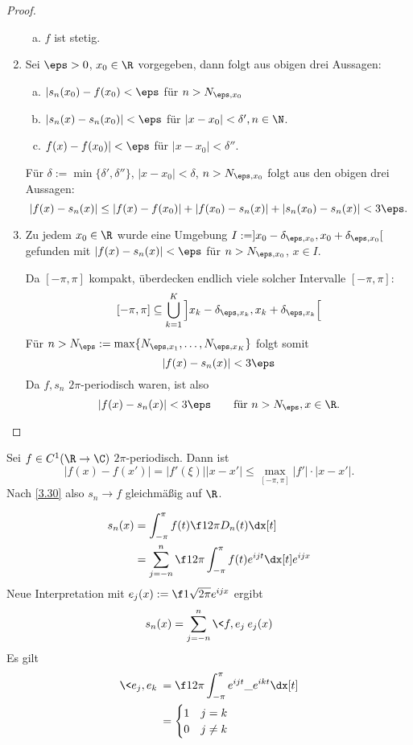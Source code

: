 \begin{st}
\begin{proof}
\begin{enumerate}[1)]
\begin{enumerate}[a)]
					\item
						$f$ ist stetig.
				\end{enumerate}
			\item
				Sei $\eps > 0$, $x_0 \in \R$ vorgegeben, dann folgt aus obigen drei Aussagen:
				\begin{enumerate}[a)]
					\item
						$|s_n(x_0) - f(x_0) < \eps$ für $n > N_{\eps, x_0}$
					\item
						$|s_n(x) - s_n(x_0)| < \eps$ für $|x-x_0| < \delta', n\in \N$.
					\item
						$f(x) - f(x_0)| < \eps$ für $|x-x_0| < \delta''$.
				\end{enumerate}
				Für $\delta := \min\{\delta', \delta''\}$, $|x-x_0| < \delta$, $n > N_{\eps, x_0}$ folgt aus den obigen drei Aussagen:
				\[
					|f(x) - s_n(x)| 
					\le |f(x) - f(x_0)| + |f(x_0)-s_n(x)| + |s_n(x_0) - s_n(x)|
					< 3\eps.
				\]
			\item
				Zu jedem $x_0 \in \R$ wurde eine Umgebung $I := ]x_0-\delta_{\eps, x_0}, x_0 + \delta_{\eps, x_0}[$ gefunden mit $|f(x) - s_n(x)| < \eps$ für $n > N_{\eps, x_0}$, $x \in  I$.

				Da $[-\pi,\pi]$ kompakt, überdecken endlich viele solcher Intervalle $[-\pi, \pi]$:
				\[
					[-\pi,\pi] \subset \bigcup_{k=1}^K \Big] x_k - \delta_{\eps, x_k}, x_k + \delta_{\eps, x_k} \Big[
				\]
				Für $n > N_\eps := \max\{N_{\eps, x_1}, \dotsc, N_{\eps, x_K}\}$ folgt somit
				\[
					|f(x) - s_n(x)| < 3\eps
				\]
				Da $f, s_n$ $2\pi$-periodisch waren, ist also
				\[
					|f(x) - s_n(x)| < 3\eps \qquad \text{für $n> N_\eps, x\in \R$.}
				\]
		\end{enumerate}
	\end{proof}
\end{st}

\begin{nt} \label{3.31}
	Sei $f \in C^1(\R \to \C)$ $2\pi$-periodisch.
	Dann ist
	\[
		|f(x) - f(x')| = |f'(\xi)||x-x'| \le \max_{[-\pi,\pi]} |f'|\cdot |x-x'|.
	\]
	Nach \ref{3.30} also $s_n \to f$ gleichmäßig auf $\R$.
\end{nt}

\begin{st} \label{3.32}
	\begin{align*}
		s_n(x) 
		&= \int_{-\pi}^{\pi} f(t) \f 1{2\pi} D_n(t) \dx[t] \\
		&= \sum_{j=-n}^n \f 1{2\pi} \int_{-\pi}^\pi f(t) e^{ijt} \dx[t] e^{ijx}
	\end{align*}
	Neue Interpretation mit $e_j(x) := \f 1{\sqrt{2\pi}} e^{ijx}$ ergibt
	\[
		s_n(x) = \sum_{j=-n}^n \<f,e_j\> e_j(x)
	\]
	Es gilt
	\begin{align*}
		\<e_j, e_k\> &= \f 1{2\pi} \int_{-\pi}^\pi e^{ijt}\_{e^{ikt}} \dx[t] \\
		&= \begin{cases}
			1 & j=k \\
			0 & j\neq k
		\end{cases}
	\end{align*}
\end{st}

